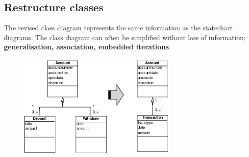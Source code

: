 \subsection{Restructure classes}
The revised class diagram represents the same information as the statechart diagrams. The class diagram can often be simplified without loss of information; \textbf{generalisation, association, embedded iterations}.

\begin{figure}[H]
    \centering
    \includegraphics[width=0.7\textwidth]{figures/modelcomponentrestructureclasses.png}
\end{figure}

